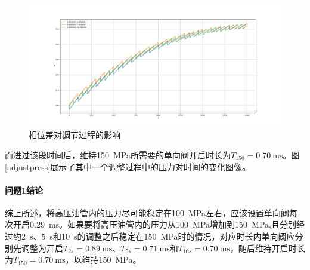 \documentclass[12pt,AutoFakeBold]{article}%
\begin{document}
    \begin{figure}[H]
        \centering
        \includegraphics[scale = 0.32]{figure/12-1-exxwc.png}
        \caption{相位差对调节过程的影响}
        \label{12exxwc}
    \end{figure}
    而进过该段时间后，维持\SI{150}{\MPa}所需要的单向阀开启时长为$T_{150}=\SI{0.70}{\ms}$。图\ref{adjustpress}展示了其中一个调整过程中的压力对时间的变化图像。\par
    \paragraph{问题1结论}
    综上所述，将高压油管内的压力尽可能稳定在\SI{100}{\MPa}左右，应该设置单向阀每次开启\SI{0.29}{\ms}。如果要将高压油管内的压力从\SI{100}{\MPa}增加到\SI{150}{\MPa},且分别经过约\SI{2}{\s}、\SI{5}{\s}和\SI{10}{\s}的调整之后稳定在\SI{150}{\MPa}时的情况，对应时长内单向阀应分别先调整为开启$T_{2s}=\SI{0.89}{\ms}$、$T_{5s}=\SI{0.71}{\ms}$和$T_{10s}=\SI{0.70}{\ms}$，随后维持开启时长为$T_{150}=\SI{0.70}{\ms}$，以维持\SI{150}{\MPa}。\par
    
\end{document}
